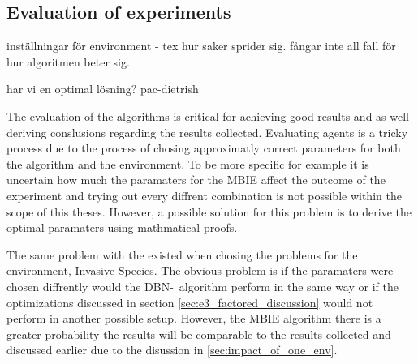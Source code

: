 \subsection{Evaluation of experiments }
inställningar för environment - tex hur saker sprider sig. fångar inte all fall för hur algoritmen beter sig.

har vi en optimal lösning? pac-dietrish

The evaluation of the algorithms is critical for achieving good results and as well deriving conslusions regarding the results collected. Evaluating agents is a tricky process due to the process of chosing approximatly correct parameters for both the algorithm and the environment. To be more specific for example it is uncertain how much the paramaters for the MBIE affect the outcome of the experiment and trying out every diffrent combination is not possible within the scope of this theses. However, a possible solution for this problem is to derive the optimal paramaters using mathmatical proofs.

The same problem with the existed when chosing the problems for the environment, Invasive Species. The obvious problem is if the paramaters were chosen diffrently would the DBN-\etre\ algorithm perform in the same way or if the optimizations discussed in section \ref{sec:e3_factored_discussion} would not perform in another possible setup. However, the MBIE algorithm there is a greater probability the results will be comparable to the results collected and discussed earlier due to the disussion in \ref{sec:impact_of_one_env}.